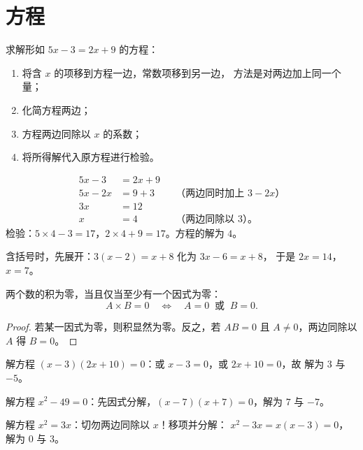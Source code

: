 \section{方程}

\begin{method}[一元一次方程]\label{met:g9:algebra:firstdegree}
求解形如 $5x - 3 = 2x + 9$ 的方程：
\begin{enumerate}
  \item 将含 $x$ 的项移到方程一边，常数项移到另一边，
        方法是对两边加上同一个量；
  \item 化简方程两边；
  \item 方程两边同除以 $x$ 的系数；
  \item 将所得解代入原方程进行检验。
\end{enumerate}
\end{method}

\begin{example}\label{ex:g9:algebra:firstdegree}
\begin{align*}
5x - 3 &= 2x + 9 \\
5x - 2x &= 9 + 3 && \text{（两边同时加上 $3 - 2x$）}\\
3x &= 12 \\
x &= 4 && \text{（两边同除以 3）。}
\end{align*}
检验：$5 \times 4 - 3 = 17$，$2 \times 4 + 9 = 17$。方程的解为
$4$。

含括号时，先展开：$3(x - 2) = x + 8$ 化为 $3x - 6 = x + 8$，
于是 $2x = 14$，$x = 7$。
\end{example}

\begin{theorem}[零因子法则]\label{thm:g9:algebra:zeroproduct}
两个数的积为零，当且仅当至少有一个因式为零：
\[
A \times B = 0
\quad\Longleftrightarrow\quad
A = 0 \ \text{ 或 } \ B = 0 .
\]
\end{theorem}

\begin{proof}
若某一因式为零，则积显然为零。反之，若 $A B = 0$ 且
$A \neq 0$，两边同除以 $A$ 得 $B = 0$。
\end{proof}

\begin{example}\label{ex:g9:algebra:zeroproduct}
解方程 $(x - 3)(2x + 10) = 0$：或 $x - 3 = 0$，或 $2x + 10 = 0$，故
解为 $3$ 与 $-5$。

解方程 $x^2 - 49 = 0$：先因式分解，$(x-7)(x+7) = 0$，解为 $7$ 与
$-7$。

解方程 $x^2 = 3x$：切勿两边同除以 $x$！移项并分解：
$x^2 - 3x = x(x - 3) = 0$，解为 $0$ 与 $3$。
\end{example}

